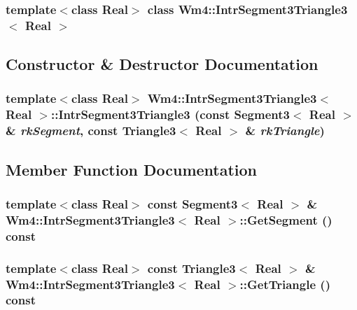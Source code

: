 \subsubsection*{template$<$class Real$>$ class Wm4::Intr\-Segment3Triangle3$<$ Real $>$}



\subsection{Constructor \& Destructor Documentation}
\subsubsection{\setlength{\rightskip}{0pt plus 5cm}template$<$class Real$>$ {\bf Wm4::Intr\-Segment3Triangle3}$<$ Real $>$::{\bf Intr\-Segment3Triangle3} (const Segment3$<$ Real $>$ \& {\em rk\-Segment}, const Triangle3$<$ Real $>$ \& {\em rk\-Triangle})}\label{classWm4_1_1IntrSegment3Triangle3_ae90a2770821bb24ea659d635c919176}




\subsection{Member Function Documentation}
\subsubsection{\setlength{\rightskip}{0pt plus 5cm}template$<$class Real$>$ const Segment3$<$ Real $>$ \& {\bf Wm4::Intr\-Segment3Triangle3}$<$ Real $>$::Get\-Segment () const}\label{classWm4_1_1IntrSegment3Triangle3_b32213d1a8556d80f3da862d80b78408}


\subsubsection{\setlength{\rightskip}{0pt plus 5cm}template$<$class Real$>$ const Triangle3$<$ Real $>$ \& {\bf Wm4::Intr\-Segment3Triangle3}$<$ Real $>$::Get\-Triangle () const}\label{classWm4_1_1IntrSegment3Triangle3_5cc684c2193aa0741761d32aef70e702}



